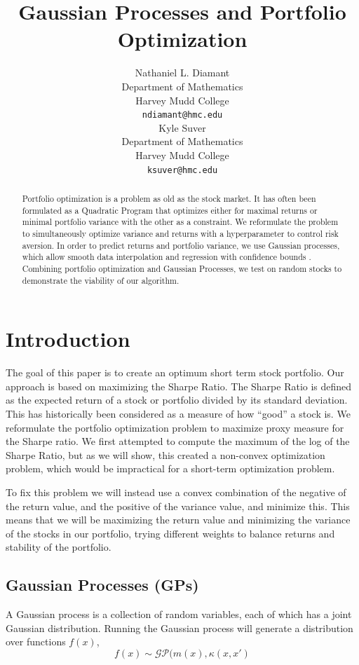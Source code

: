 \documentclass{article}
\title{Gaussian Processes and Portfolio Optimization}
\author{
  Nathaniel L. Diamant \\
  Department of Mathematics\\
  Harvey Mudd College\\
  \texttt{ndiamant@hmc.edu} \\
  \And Kyle Suver \\
  Department of Mathematics\\
  Harvey Mudd College\\
  \texttt{ksuver@hmc.edu} \\
}
\begin{document}
\maketitle

\begin{abstract}
  Portfolio optimization is a problem as old as the stock market. It has often been formulated as a Quadratic Program \cite{convex} that optimizes either for maximal returns or minimal portfolio variance with the other as a constraint. We reformulate the problem to simultaneously optimize variance and returns with a hyperparameter to control risk aversion. In order to predict returns and portfolio variance, we use Gaussian processes, which allow smooth data interpolation and regression with confidence bounds \cite{spectral}. Combining portfolio optimization and Gaussian Processes, we test on random stocks to demonstrate the viability of our algorithm.
\end{abstract}

\section{Introduction}
\label{intro}

The goal of this paper is to create an optimum short term stock portfolio.  Our approach is based on maximizing the Sharpe Ratio.  The Sharpe Ratio is defined as the expected return of a stock or portfolio divided by its standard deviation.  This has historically been considered as a measure of how ``good'' a stock is. We reformulate the portfolio optimization problem to maximize proxy measure for the Sharpe ratio.  We first attempted to compute the maximum of the log of the Sharpe Ratio, but as we will show, this created a non-convex optimization problem, which would be impractical for a short-term optimization problem.  

To fix this problem we will instead use a convex combination of the negative of the return value, and the positive of the variance value, and minimize this.  This means that we will be maximizing the return value and minimizing the variance of the stocks in our portfolio, trying different weights to balance returns and stability of the portfolio.

\subsection{Gaussian Processes (GPs)}

A Gaussian process is a collection of random variables, each of which has a joint Gaussian distribution.  Running the Gaussian process will generate a distribution over functions $f(x)$,
\begin{equation}
	f(x) \sim \mathcal{GP}(m(x), \kappa(x, x')
    \label{eqn:GP}
\end{equation}
\end{document}
